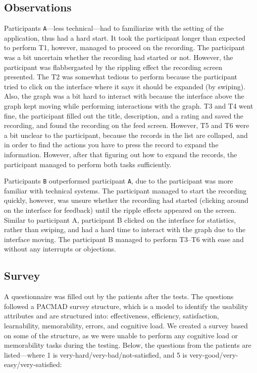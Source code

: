 \subsection{Observations}
Participants \verb|A|---less technical---had to familiarize with the setting of the application, thus had a hard start. It took the participant longer than expected to perform T1, however, managed to proceed on the recording. The participant was a bit uncertain whether the recording had started or not. However, the participant was flabbergasted by the rippling effect the recording screen presented. The T2 was somewhat tedious to perform because the participant tried to click on the interface where it says it should be expanded (by swiping). Also, the graph was a bit hard to interact with because the interface above the graph kept moving while performing interactions with the graph. T3 and T4 went fine, the participant filled out the title, description, and a rating and saved the recording, and found the recording on the feed screen. However, T5 and T6 were a bit unclear to the participant, because the records in the list are collaped, and in order to find the actions you have to press the record to expand the information. However, after that figuring out how to expand the records, the participant managed to perform both tasks sufficiently.

Participants \verb|B| outperformed participant \verb|A|, due to the participant was more familiar with technical systems. The participant managed to start the recording quickly, however, was unsure whether the recording had started (clicking around on the interface for feedback) until the ripple effects appeared on the screen. Similar to participant A, participant B clicked on the interface for statistics, rather than swiping, and had a hard time to interact with the graph due to the interface moving. The participant B managed to perform T3--T6 with ease and without any interrupts or objections. 

\subsection{Survey}
A questionnaire was filled out by the patients after the tests. The questions followed a PACMAD survey structure, which is a model to identify the usability attributes and are structured into: effectiveness, efficiency, satisfaction, learnability, memorability, errors, and cognitive load. We created a survey based on some of the structure, as we were unable to perform any cognitive load or memorability tasks during the testing. Below, the questions from the patients are listed---where 1 is very-hard/very-bad/not-satisfied, and 5 is very-good/very-easy/very-satisfied: 

